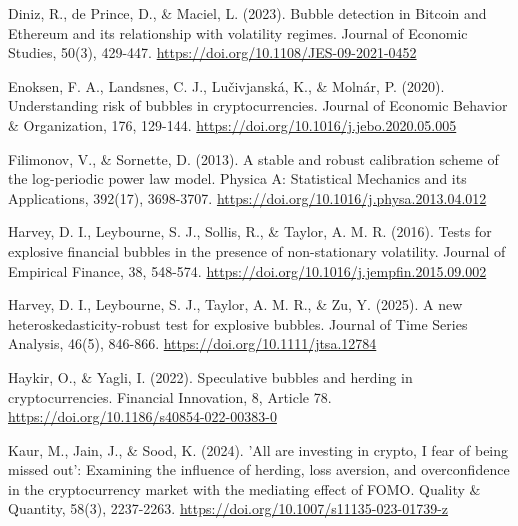 \documentclass[11pt,a4paper,onecolumn]{article}
\newenvironment{reportreference}{\begingroup\small\setlength{\parskip}{5pt}\leftskip=5mm\parindent=-5mm}{\par\endgroup}
\begin{document}
\begin{reportreference}
Diniz, R., de Prince, D., \& Maciel, L. (2023). Bubble detection in Bitcoin and Ethereum and its relationship with volatility regimes. Journal of Economic Studies, 50(3), 429-447. \url{https://doi.org/10.1108/JES-09-2021-0452}
\end{reportreference}

\begin{reportreference}
Enoksen, F. A., Landsnes, C. J., Lučivjanská, K., \& Molnár, P. (2020). Understanding risk of bubbles in cryptocurrencies. Journal of Economic Behavior \& Organization, 176, 129-144. \url{https://doi.org/10.1016/j.jebo.2020.05.005}
\end{reportreference}

\begin{reportreference}
Filimonov, V., \& Sornette, D. (2013). A stable and robust calibration scheme of the log-periodic power law model. Physica A: Statistical Mechanics and its Applications, 392(17), 3698-3707. \url{https://doi.org/10.1016/j.physa.2013.04.012}
\end{reportreference}

\begin{reportreference}
Harvey, D. I., Leybourne, S. J., Sollis, R., \& Taylor, A. M. R. (2016). Tests for explosive financial bubbles in the presence of non-stationary volatility. Journal of Empirical Finance, 38, 548-574. \url{https://doi.org/10.1016/j.jempfin.2015.09.002}
\end{reportreference}

\begin{reportreference}
Harvey, D. I., Leybourne, S. J., Taylor, A. M. R., \& Zu, Y. (2025). A new heteroskedasticity-robust test for explosive bubbles. Journal of Time Series Analysis, 46(5), 846-866. \url{https://doi.org/10.1111/jtsa.12784}
\end{reportreference}

\begin{reportreference}
Haykir, O., \& Yagli, I. (2022). Speculative bubbles and herding in cryptocurrencies. Financial Innovation, 8, Article 78. \url{https://doi.org/10.1186/s40854-022-00383-0}
\end{reportreference}

\begin{reportreference}
Kaur, M., Jain, J., \& Sood, K. (2024). 'All are investing in crypto, I fear of being missed out': Examining the influence of herding, loss aversion, and overconfidence in the cryptocurrency market with the mediating effect of FOMO. Quality \& Quantity, 58(3), 2237-2263. \url{https://doi.org/10.1007/s11135-023-01739-z}
\end{reportreference}
\end{document}
